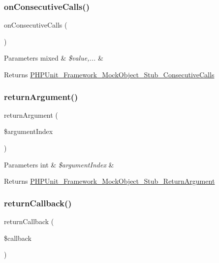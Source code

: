 \subsubsection{\texorpdfstring{on\+Consecutive\+Calls()}{onConsecutiveCalls()}}
{\footnotesize\ttfamily on\+Consecutive\+Calls (\begin{DoxyParamCaption}{ }\end{DoxyParamCaption})}


\begin{DoxyParams}[1]{Parameters}
mixed & {\em \$value,...} & \\
\hline
\end{DoxyParams}
\begin{DoxyReturn}{Returns}
\mbox{\hyperlink{class_p_h_p_unit___framework___mock_object___stub___consecutive_calls}{P\+H\+P\+Unit\+\_\+\+Framework\+\_\+\+Mock\+Object\+\_\+\+Stub\+\_\+\+Consecutive\+Calls}} 
\end{DoxyReturn}
\mbox{\label{_functions_8php_a8195d1a7e82b5a06e93ac75338d4f267}} 
\subsubsection{\texorpdfstring{return\+Argument()}{returnArgument()}}
{\footnotesize\ttfamily return\+Argument (\begin{DoxyParamCaption}\item[{}]{\$argument\+Index }\end{DoxyParamCaption})}


\begin{DoxyParams}[1]{Parameters}
int & {\em \$argument\+Index} & \\
\hline
\end{DoxyParams}
\begin{DoxyReturn}{Returns}
\mbox{\hyperlink{class_p_h_p_unit___framework___mock_object___stub___return_argument}{P\+H\+P\+Unit\+\_\+\+Framework\+\_\+\+Mock\+Object\+\_\+\+Stub\+\_\+\+Return\+Argument}} 
\end{DoxyReturn}
\mbox{\label{_functions_8php_a5180e79959c104a66fdb4d790ffd2c5a}} 
\subsubsection{\texorpdfstring{return\+Callback()}{returnCallback()}}
{\footnotesize\ttfamily return\+Callback (\begin{DoxyParamCaption}\item[{}]{\$callback }\end{DoxyParamCaption})}



